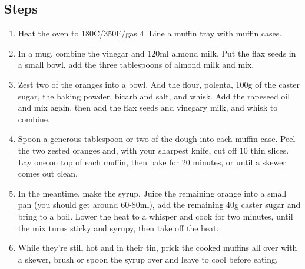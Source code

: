 \documentclass{book}
\begin{document}
\subsection*{Steps}
\begin{enumerate}
\item Heat the oven to 180C/350F/gas 4. Line a muffin tray with muffin cases.
\item In a mug, combine the vinegar and 120ml almond milk. Put the flax seeds in a small bowl, add the three tablespoons of almond milk and mix.
\item Zest two of the oranges into a bowl. Add the flour, polenta, 100g of the caster sugar, the baking powder, bicarb and salt, and whisk. Add the rapeseed oil and mix again, then add the flax seeds and vinegary milk, and whisk to combine.
\item Spoon a generous tablespoon or two of the dough into each muffin case. Peel the two zested oranges and, with your sharpest knife, cut off 10 thin slices. Lay one on top of each muffin, then bake for 20 minutes, or until a skewer comes out clean.
\item In the meantime, make the syrup. Juice the remaining orange into a small pan (you should get around 60-80ml), add the remaining 40g caster sugar and bring to a boil. Lower the heat to a whisper and cook for two minutes, until the mix turns sticky and syrupy, then take off the heat.
\item While they’re still hot and in their tin, prick the cooked muffins all over with a skewer, brush or spoon the syrup over and leave to cool before eating.
\end{enumerate}
\newpage
\end{document}
